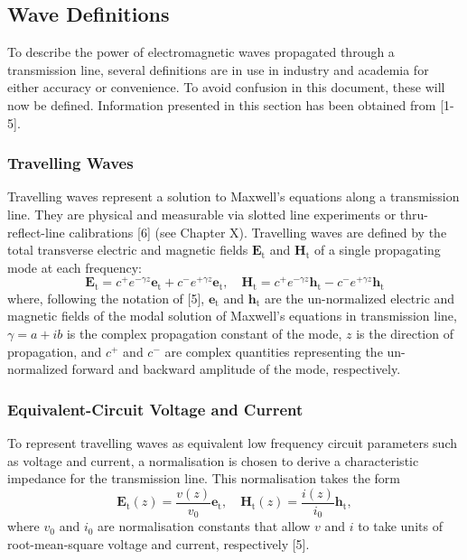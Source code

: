 \documentclass[../thesis.tex]{subfiles}
\begin{document}
\begin{refsection}
\subsection{Wave Definitions}

To describe the power of electromagnetic waves propagated through a transmission line, several definitions are in use in industry and academia for either accuracy or convenience. To avoid confusion in this document, these will now be defined. Information presented in this section has been obtained from [1-5].

\subsubsection{Travelling Waves}

Travelling waves represent a solution to Maxwell's equations along a transmission line. They are physical and measurable via slotted line experiments or thru-reflect-line calibrations [6] (see Chapter X). Travelling waves are defined by the total transverse electric and magnetic fields $\bm{E}_\textrm{t}$ and $\bm{H}_\textrm{t}$ of a single propagating mode at each frequency:
\begin{equation}
\bm{E}_\textrm{t}=c^+e^{-\gamma z}\bm{e}_\textrm{t}+c^-e^{+\gamma z}\bm{e}_\textrm{t},\quad
\bm{H}_\textrm{t}=c^+e^{-\gamma z}\bm{h}_\textrm{t}-c^-e^{+\gamma z}\bm{h}_\textrm{t}
\end{equation}
where, following the notation of [5], $\bm{e}_\textrm{t}$ and $\bm{h}_\textrm{t}$ are the un-normalized electric and magnetic fields of the modal solution of Maxwell’s equations in transmission line, $\gamma=a+ib$ is the complex propagation constant of the mode, $z$ is the direction of propagation, and $c^+$ and $c^-$ are complex quantities representing the un-normalized forward and backward amplitude of the mode, respectively.

\subsubsection{Equivalent-Circuit Voltage and Current}

To represent travelling waves as equivalent low frequency circuit parameters such as voltage and current, a normalisation is chosen to derive a characteristic impedance for the transmission line. This normalisation takes the form
\begin{equation}
\bm{E}_\textrm{t}(z)=\dfrac{v(z)}{v_0}\bm{e}_\textrm{t},\quad
\bm{H}_\textrm{t}(z)=\dfrac{i(z)}{i_0}\bm{h}_\textrm{t},
\end{equation}
where $v_0$ and $i_0$ are normalisation constants that allow $v$ and $i$ to take units of root-mean-square voltage and current, respectively [5].


\end{refsection}
\end{document}
